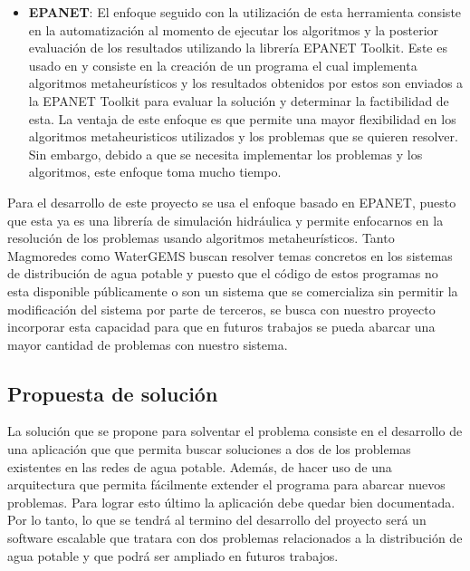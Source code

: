 \documentclass[11pt,letterpaper]{article}
\begin{document}
\begin{itemize}
	\item \textbf{EPANET}: El enfoque seguido con la utilización de esta herramienta consiste en la automatización al momento de ejecutar los algoritmos y la posterior evaluación de los resultados utilizando la librería EPANET Toolkit. Este es usado en \cite{Doctoral2012} y consiste en la creación de un programa el cual implementa algoritmos metaheurísticos y los resultados obtenidos por estos son enviados a la EPANET Toolkit para evaluar la solución y determinar la factibilidad de esta. La ventaja de este enfoque es que permite una mayor flexibilidad en los algoritmos metaheuristicos utilizados y los problemas que se quieren resolver. Sin embargo, debido a que se necesita implementar los problemas y los algoritmos, este enfoque toma mucho tiempo.
\end{itemize}

Para el desarrollo de este proyecto se usa el enfoque basado en EPANET, puesto que esta ya es una librería de simulación hidráulica y permite enfocarnos en la resolución de los problemas usando algoritmos metaheurísticos. Tanto Magmoredes como WaterGEMS buscan resolver temas concretos en los sistemas de distribución de agua potable y puesto que el código de estos programas no esta disponible públicamente o son un sistema que se comercializa sin permitir la modificación del sistema por parte de terceros, se busca con nuestro proyecto incorporar esta capacidad para que en futuros trabajos se pueda abarcar una mayor cantidad de problemas con nuestro sistema.

\subsection{Propuesta de solución}


La solución que se propone para solventar el problema consiste en el desarrollo de una aplicación que 
que permita buscar soluciones a dos de los problemas existentes en las redes de agua potable. Además, de hacer uso de una arquitectura que permita fácilmente extender el programa para abarcar nuevos problemas. Para lograr esto  último la aplicación debe quedar bien documentada. Por lo tanto, lo que se tendrá al termino del desarrollo del proyecto será un software escalable que tratara con dos problemas relacionados a la distribución de agua potable y que podrá ser ampliado en futuros trabajos.
\end{document}
